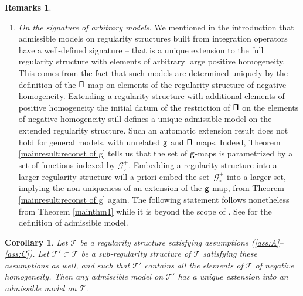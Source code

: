 \documentclass[JEP,XML,SOM,Unicode,published]{cedram}
\theoremstyle{plain}
\newtheorem{cor}[thm]{Corollary}
\theoremstyle{definition}
\newtheorem*{remarks*} {Remarks}
\newcommand{\scrT}{\mathscr{T}}
\newcommand{\bbR}{\mathbb{R}}
\newcommand{\bbZ}{\mathbb{Z}}
\newcommand{\mcG}{\mathcal{G}}
\begin{document}
\begin{remarks*}
\begin{enumerate}
(Theorem \ref{mainthm1} cannot be applied in a finite region $[0,T]$ directly. To overcome this point, we extend a function $f\in C([0,T], \bbR^\ell)$ to $[-T,T]$ symmetrically, and extend it to $\big[(2n-1)T, (2n+1)T\big]$ for any $n\in\bbZ$ periodically. Then for any $\alpha\in(0,1)$, the Hölder space $C^\alpha([0,T],\bbR^\ell)$ is identified with the space
\[
C_{p,s}^\alpha(\bbR, \bbR^\ell) := \Big\{ f\in C^\alpha(\bbR,\bbR^\ell)\,;\, f(t)=f(-t),\ f(t+2T)=f(t)\ \text{for any $t\in \bbR$} \Big\}.
\]
Note that Littlewood-Paley blocks $\Delta_i$ preserve the symmetry and periodicity, so such spaces are closed under paradifferential operators (paraproduct, its two-parameter extension, etc.) used in this paper. Hence we can apply Theorem \ref{mainthm1} to such spaces.)

\item
\emph{On the signature of arbitrary models}. We mentioned in the introduction that admissible models on regularity structures built from integration operators have a well-defined signature -- that is a unique extension to the full regularity structure with elements of arbitrary large positive homogeneity. This comes from the fact that such models are determined uniquely by the definition of the $\sf \Pi$ map on elements of the regularity structure of negative homogeneity. Extending a regularity structure with additional elements of positive homogeneity the initial datum of the restriction of $\sf \Pi$ on the elements of negative homogeneity still defines a unique admissible model on the extended regularity structure. Such an automatic extension result does not hold for general models, with unrelated $\sf g$ and $\sf \Pi$ maps. Indeed, Theorem \ref{mainresult:reconst of g} tells us that the set of $\sf g$-maps is parametrized by a set of functions indexed by $\mcG^+_\circ$. Embedding a regularity structure into a larger regularity structure will a priori embed the set~$\mcG^+_\circ$ into a larger set, implying the non-uniqueness of an extension of the $\sf g$-map, from Theorem \ref{mainresult:reconst of g} again. The following statement follows nonetheless from Theorem \ref{mainthm1} while it is beyond the scope of \cite[Th.\,21]{BH}. See \cite[\S4]{BH} for the definition of admissible model.
\end{enumerate}
\end{remarks*}

\begin{cor}
Let $\scrT$ be a regularity structure satisfying assumptions \textup{(\ref{ass:A}--\ref{ass:C})}. Let $\scrT'\subset\scrT$ be a sub-regularity structure of $\scrT$ satisfying these assumptions as well, and such that $\scrT'$ contains all the elements of $\scrT$ of negative homogeneity. Then any admissible model on $\scrT'$ has a unique extension into an admissible model on $\scrT$.
\end{cor}
\end{document}
